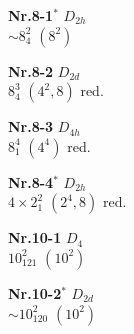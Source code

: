 \documentclass[12pt]{article}
\begin{document}
{\begin{minipage}[t]{3.5cm}
{{\bf Nr.8-1${}^*$} \quad $D_{2h}$\\ $\sim 8^2_4$ \quad $(8^2)$\\\vspace{3mm} }
\end{minipage}
\setlength{\unitlength}{1cm}
\begin{minipage}[t]{3.5cm}
\centering
\epsfxsize=2.5cm
\par
{{\bf Nr.8-2} \quad $D_{2d}$\\ $8^3_4$ \quad $(4^2,8)$ red.\\\vspace{3mm} }
\end{minipage}
\setlength{\unitlength}{1cm}
\begin{minipage}[t]{3.5cm}
\centering
\epsfxsize=2.5cm
\par
{{\bf Nr.8-3} \quad $D_{4h}$\\ $8^4_{1}$ \quad $(4^4)$ red.\\\vspace{3mm} }
\end{minipage}
\setlength{\unitlength}{1cm}
\begin{minipage}[t]{3.5cm}
\centering
\epsfxsize=2.5cm
\par
{{\bf Nr.8-4${}^*$} \quad $D_{2h}$\\ $4\times 2^2_1$ \quad $(2^4,8)$ red.\\\vspace{3mm} }
\end{minipage}
\setlength{\unitlength}{1cm}
\begin{minipage}[t]{3.5cm}
\centering
\epsfxsize=2.5cm
\par
{{\bf Nr.10-1} \quad $D_4$\\ $10^2_{121}$ \quad $(10^2)$\\\vspace{3mm} }
\end{minipage}
\setlength{\unitlength}{1cm}
\begin{minipage}[t]{3.5cm}
\centering
\epsfxsize=2.5cm
\par
{{\bf Nr.10-2${}^*$} \quad $D_{2d}$\\ $\sim 10^2_{120}$ \quad $(10^2)$\\\vspace{3mm} }
\end{minipage}
\setlength{\unitlength}{1cm}
\begin{minipage}[t]{3.5cm}

\end{minipage}}
\end{document}
